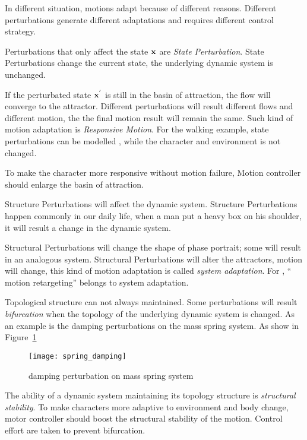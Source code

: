In different situation, motions adapt because of different reasons.
Different perturbations generate different adaptations and requires different control strategy.

\begin{itemize}

Perturbations that only affect the state $\mathbf{x}$ are \emph{State Perturbation}.
State Perturbations change the current state, the underlying dynamic system is unchanged.


If the perturbated state $\mathbf{x}^{'}$ is still in the basin of attraction, the flow will converge to the attractor. 
Different perturbations will result different flows and different motion, the the final motion result will remain the same.
Such kind of motion adaptation is \emph{Responsive Motion}.
For the walking example, state perturbations can be modelled , while the character and environment is not changed.

To make the character more responsive without motion failure,
Motion controller should enlarge the basin of attraction.






Structure Perturbations will affect the dynamic system.
Structure Perturbations happen commonly in our daily life, when a man put a heavy box on his shoulder, it will result a change in the dynamic system.



Structural Perturbations will change the shape of phase portrait; some will result in an analogous system.
Structural Perturbations will alter the  attractors, motion will change, this kind of motion adaptation is called \emph{system adaptation}.
For \cms, `` motion retargeting'' belongs to system adaptation.

Topological structure can not always maintained.
Some perturbations will result \emph{bifurcation} when the topology of the underlying dynamic system is changed.
As an  example is the damping perturbations on the mass spring system.
As show in Figure~\ref{fig:dampmass}

\begin{figure}
\begin{center}
\texttt{[image: spring\_damping]}
\end{center}
\caption{damping perturbation on mass spring system}
\label{fig:dampmass}
\end{figure}

The ability of a dynamic system maintaining its topology structure is \emph{structural stability}.
To make characters more adaptive to environment and body change, motor controller should boost the structural stability of the motion.
Control effort are taken to prevent bifurcation.
\end{itemize}


